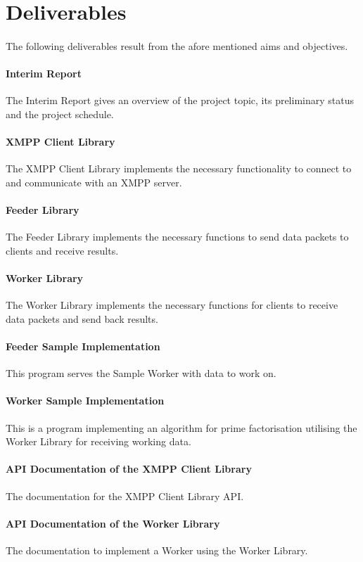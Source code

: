 \section{Deliverables}
\paragraph{}
The following deliverables result from the afore mentioned aims and objectives.

\paragraph{Interim Report} The Interim Report gives an overview of the project topic, its preliminary status and the project schedule.
\paragraph{XMPP Client Library} The XMPP Client Library implements the necessary functionality to connect to and communicate with an XMPP server.
\paragraph{Feeder Library} The Feeder Library implements the necessary functions to send data packets to clients and receive results.
\paragraph{Worker Library} The Worker Library implements the necessary functions for clients to receive data packets and send back results.
\paragraph{Feeder Sample Implementation} This program serves the Sample Wor\-ker with data to work on.
\paragraph{Worker Sample Implementation} This is a program implementing an algorithm for prime factorisation utilising the Worker Library for receiving working data.
\paragraph{API Documentation of the XMPP Client Library} The documentation for the XMPP Client Library API.
\paragraph{API Documentation of the Worker Library} The documentation to implement a Worker using the Worker Library.
